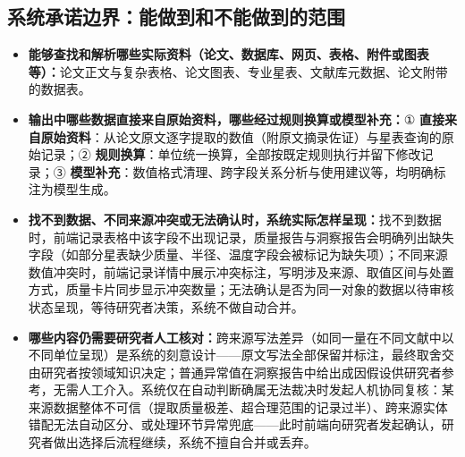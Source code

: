 \subsection{系统承诺边界：能做到和不能做到的范围}

\begin{itemize}[leftmargin=1.2em,itemsep=2pt]
\item \textbf{能够查找和解析哪些实际资料（论文、数据库、网页、表格、附件或图表等）：}论文正文与复杂表格、论文图表、专业星表、文献库元数据、论文附带的数据表。
\item \textbf{输出中哪些数据直接来自原始资料，哪些经过规则换算或模型补充：}① \textbf{直接来自原始资料}：从论文原文逐字提取的数值（附原文摘录佐证）与星表查询的原始记录；② \textbf{规则换算}：单位统一换算，全部按既定规则执行并留下修改记录；③ \textbf{模型补充}：数值格式清理、跨字段关系分析与使用建议等，均明确标注为模型生成。
\item \textbf{找不到数据、不同来源冲突或无法确认时，系统实际怎样呈现：}找不到数据时，前端记录表格中该字段不出现记录，质量报告与洞察报告会明确列出缺失字段（如部分星表缺少质量、半径、温度字段会被标记为缺失项）；不同来源数值冲突时，前端记录详情中展示冲突标注，写明涉及来源、取值区间与处置方式，质量卡片同步显示冲突数量；无法确认是否为同一对象的数据以待审核状态呈现，等待研究者决策，系统不做自动合并。
\item \textbf{哪些内容仍需要研究者人工核对：}跨来源写法差异（如同一量在不同文献中以不同单位呈现）是系统的刻意设计——原文写法全部保留并标注，最终取舍交由研究者按领域知识决定；普通异常值在洞察报告中给出成因假设供研究者参考，无需人工介入。系统仅在自动判断确属无法裁决时发起人机协同复核：某来源数据整体不可信（提取质量极差、超合理范围的记录过半）、跨来源实体错配无法自动区分、或处理环节异常兜底——此时前端向研究者发起确认，研究者做出选择后流程继续，系统不擅自合并或丢弃。
\end{itemize}

